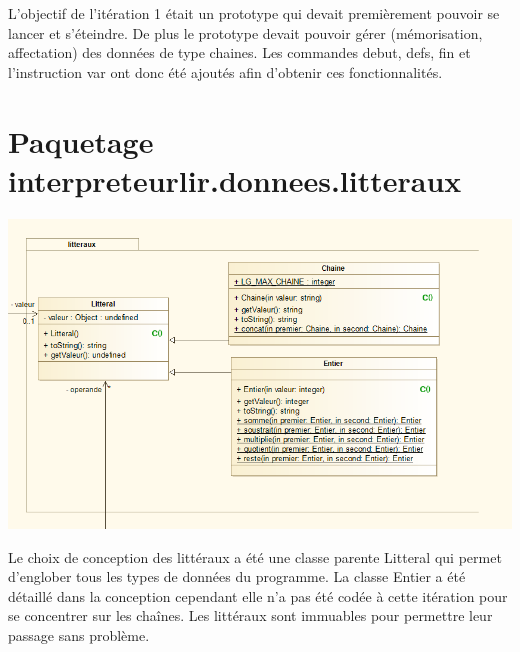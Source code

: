 \par L'objectif de l'itération 1 était un prototype qui devait premièrement pouvoir se lancer et s'éteindre. De plus le prototype devait pouvoir gérer (mémorisation, affectation) des données de type chaines. Les commandes debut, defs, fin et l'instruction var ont donc été ajoutés afin d'obtenir ces fonctionnalités.

\section{Paquetage interpreteurlir.donnees.litteraux}
\begin{center}\includegraphics[scale=0.75]{./img/COO/COO_prototype_1/PackageLitteraux}\end{center}
\par Le choix de conception des littéraux a été une classe parente Litteral qui permet d'englober tous les types de données du programme.
La classe Entier a été détaillé dans la conception cependant elle n'a pas été codée à cette itération pour se concentrer sur les chaînes.
Les littéraux sont immuables pour permettre leur passage sans problème.

